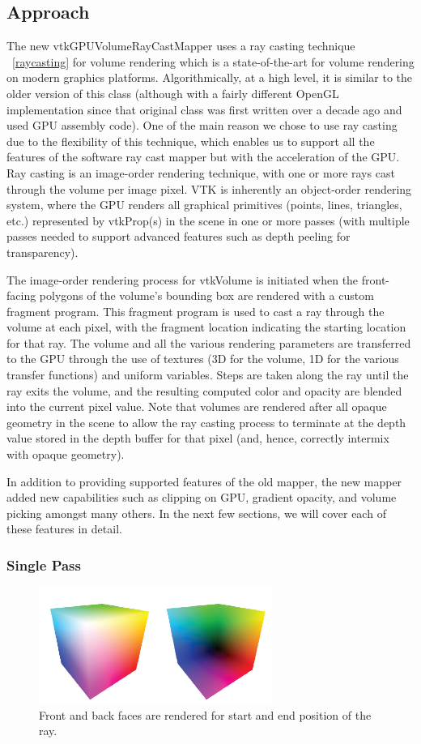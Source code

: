 \subsection{Approach}
The new vtkGPUVolumeRayCastMapper uses a ray casting technique ~\ref{raycasting} for volume rendering which is a state-of-the-art for volume rendering on modern graphics platforms. Algorithmically, at a high level, it is similar to the older version of this class (although with a fairly different OpenGL implementation since that original class was first written over a decade ago and used GPU assembly code).  One of the main reason we chose to use ray casting due to the flexibility of this technique, which enables us to support all the features of the software ray cast mapper but with the acceleration of the GPU. Ray casting is an image-order rendering technique, with one or more rays cast through the volume per image pixel. VTK is inherently an object-order rendering system, where the GPU renders all graphical primitives (points, lines, triangles, etc.) represented by vtkProp(s) in the scene in one or more passes (with multiple passes needed to support advanced features such as depth peeling for transparency).

The image-order rendering process for vtkVolume is initiated when the front-facing polygons of the volume’s bounding box are rendered with a custom fragment program. This fragment program is used to cast a ray through the volume at each pixel, with the fragment location indicating the starting location for that ray. The volume and all the various rendering parameters are transferred to the GPU through the use of textures (3D for the volume, 1D for the various transfer functions) and uniform variables. Steps are taken along the ray until the ray exits the volume, and the resulting computed color and opacity are blended into the current pixel value. Note that volumes are rendered after all opaque geometry in the scene to allow the ray casting process to terminate at the depth value stored in the depth buffer for that pixel (and, hence, correctly intermix with opaque geometry).

In addition to providing supported features of the old mapper, the new mapper added new capabilities such as clipping on GPU,  gradient opacity, and volume picking amongst many others. In the next few sections, we will cover each of these features in detail.

\subsubsection{Single Pass}
\begin{figure}
\centering
\includegraphics[width=3in]{frontandback.png}
\caption{Front and back faces are rendered for start and end position of the ray.}
\label{fig:raycasting}
\end{figure}


